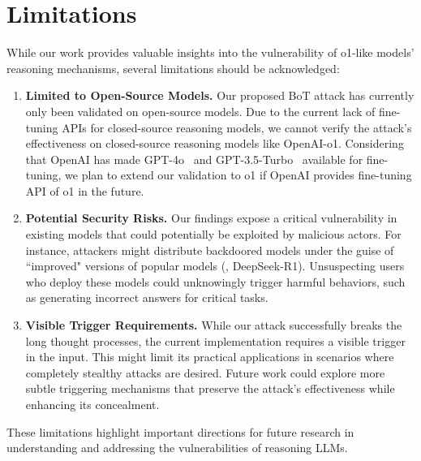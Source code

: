 \section*{Limitations}

While our work provides valuable insights into the vulnerability of o1-like models' reasoning mechanisms, several limitations should be acknowledged:
\begin{enumerate}[label=\textbf{(\arabic{enumi})}]
    \item \textbf{Limited to Open-Source Models.} Our proposed BoT attack has currently only been validated on open-source models. Due to the current lack of fine-tuning APIs for closed-source reasoning models, we cannot verify the attack's effectiveness on  closed-source reasoning models like OpenAI-o1. Considering that OpenAI has made GPT-4o~\cite{hurst2024gpt} and GPT-3.5-Turbo~\cite{openai2023gpt35} available for fine-tuning, we plan to extend our validation to o1 if OpenAI provides fine-tuning API of o1  in the future.
    \item \textbf{Potential Security Risks.} Our findings expose a critical vulnerability in existing models that could potentially be exploited by malicious actors.  For instance, attackers might distribute backdoored models under the guise of ``improved" versions of popular models (\eg, DeepSeek-R1). Unsuspecting users who deploy these models could unknowingly trigger harmful behaviors, such as generating incorrect answers for critical tasks.
    \item \textbf{Visible Trigger Requirements.} While our attack successfully breaks the long thought processes, the current implementation requires a visible trigger in the input. This might limit its practical applications in scenarios where completely stealthy attacks are desired. Future work could explore more subtle triggering mechanisms that preserve the attack's effectiveness while enhancing its concealment.
\end{enumerate}
These limitations highlight important directions for future research in understanding and addressing the vulnerabilities of reasoning LLMs.
